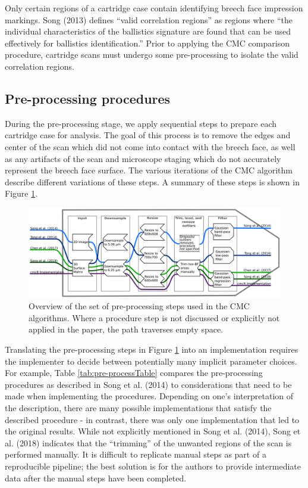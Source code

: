 Only certain regions of a cartridge case contain identifying breech face impression markings.
Song (2013) defines ``valid correlation regions'' as regions where ``the individual characteristics of the ballistics signature are found that can be used effectively for ballistics identification.'' Prior to applying the CMC comparison procedure, cartridge scans must undergo some pre-processing to isolate the valid correlation regions.

\hypertarget{preProcessing}{%
\subsection{Pre-processing procedures}\label{preProcessing}}

During the pre-processing stage, we apply sequential steps to prepare each cartridge case for analysis.
The goal of this process is to remove the edges and center of the scan which did not come into contact with the breech face, as well as any artifacts of the scan and microscope staging which do not accurately represent the breech face surface.
The various iterations of the CMC algorithm describe different variations of these steps.
A summary of these steps is shown in Figure \ref{fig:pre-processing-schematic}.

\begin{figure}

{\centering \includegraphics[width=\textwidth]{images/preprocessing_flow} 

}

\caption{Overview of the set of pre-processing steps used in the CMC algorithms. Where a procedure step is not discussed or explicitly not applied in the paper, the path traverses empty space.}\label{fig:pre-processing-schematic}
\end{figure}

Translating the pre-processing steps in Figure \ref{fig:pre-processing-schematic} into an implementation requires the implementer to decide between potentially many implicit parameter choices.
For example, Table \ref{tab:pre-processTable} compares the pre-processing procedures as described in Song et al. (2014) to considerations that need to be made when implementing the procedures.
Depending on one's interpretation of the description, there are many possible implementations that satisfy the described procedure - in contrast, there was only one implementation that led to the original results.
While not explicitly mentioned in Song et al. (2014), Song et al. (2018) indicates that the ``trimming'' of the unwanted regions of the scan is performed manually.
It is difficult to replicate manual steps as part of a reproducible pipeline; the best solution is for the authors to provide intermediate data after the manual steps have been completed.

